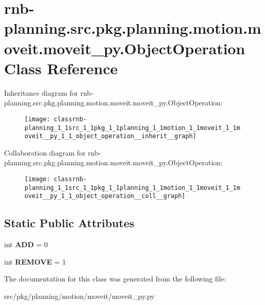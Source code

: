 \hypertarget{classrnb-planning_1_1src_1_1pkg_1_1planning_1_1motion_1_1moveit_1_1moveit__py_1_1_object_operation}{}\section{rnb-\/planning.src.\+pkg.\+planning.\+motion.\+moveit.\+moveit\+\_\+py.\+Object\+Operation Class Reference}
\label{classrnb-planning_1_1src_1_1pkg_1_1planning_1_1motion_1_1moveit_1_1moveit__py_1_1_object_operation}


Inheritance diagram for rnb-\/planning.src.\+pkg.\+planning.\+motion.\+moveit.\+moveit\+\_\+py.\+Object\+Operation\+:
\nopagebreak
\begin{figure}[H]
\begin{center}
\leavevmode
\texttt{[image: classrnb-planning\_1\_1src\_1\_1pkg\_1\_1planning\_1\_1motion\_1\_1moveit\_1\_1moveit\_\_py\_1\_1\_object\_operation\_\_inherit\_\_graph]}
\end{center}
\end{figure}


Collaboration diagram for rnb-\/planning.src.\+pkg.\+planning.\+motion.\+moveit.\+moveit\+\_\+py.\+Object\+Operation\+:
\nopagebreak
\begin{figure}[H]
\begin{center}
\leavevmode
\texttt{[image: classrnb-planning\_1\_1src\_1\_1pkg\_1\_1planning\_1\_1motion\_1\_1moveit\_1\_1moveit\_\_py\_1\_1\_object\_operation\_\_coll\_\_graph]}
\end{center}
\end{figure}
\subsection*{Static Public Attributes}
\begin{DoxyCompactItemize}
\item 
\mbox{\label{classrnb-planning_1_1src_1_1pkg_1_1planning_1_1motion_1_1moveit_1_1moveit__py_1_1_object_operation_ac329813786da38dcaf163df4d7cf222d}} 
int {\bfseries A\+DD} = 0
\item 
\mbox{\label{classrnb-planning_1_1src_1_1pkg_1_1planning_1_1motion_1_1moveit_1_1moveit__py_1_1_object_operation_a08b1eae9683ee48314d37bca99ff4886}} 
int {\bfseries R\+E\+M\+O\+VE} = 1
\end{DoxyCompactItemize}


The documentation for this class was generated from the following file\+:\begin{DoxyCompactItemize}
\item 
src/pkg/planning/motion/moveit/moveit\+\_\+py.\+py\end{DoxyCompactItemize}
